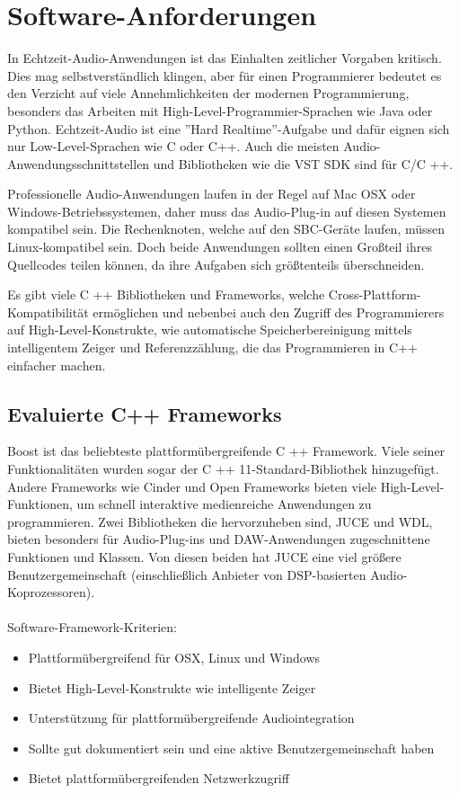 \section{Software-Anforderungen}

In Echtzeit-Audio-Anwendungen ist das Einhalten zeitlicher Vorgaben kritisch. Dies mag selbstverständlich klingen, aber für einen Programmierer bedeutet es den Verzicht auf viele Annehmlichkeiten der modernen Programmierung, besonders das Arbeiten mit High-Level-Programmier-Sprachen wie Java oder Python. Echtzeit-Audio ist eine ”Hard Realtime”-Aufgabe und dafür eignen sich nur Low-Level-Sprachen wie C oder C++. Auch die meisten Audio-Anwendungsschnittstellen und Bibliotheken wie die VST SDK sind für C/C ++.

Professionelle Audio-Anwendungen laufen in der Regel auf Mac OSX oder Windows-Betriebssystemen, daher muss das Audio-Plug-in auf diesen Systemen  kompatibel sein. Die Rechenknoten, welche auf den SBC-Geräte laufen, müssen  Linux-kompatibel sein. Doch beide Anwendungen sollten einen Großteil ihres Quellcodes teilen können, da ihre Aufgaben sich größtenteils überschneiden.

Es gibt viele C ++ Bibliotheken und Frameworks, welche Cross-Plattform-Kompatibilität ermöglichen und nebenbei auch den Zugriff des Programmierers auf High-Level-Konstrukte, wie automatische Speicherbereinigung mittels intelligentem Zeiger und Referenzzählung, die das Programmieren in C++ einfacher machen.

\subsection{Evaluierte C++ Frameworks}

Boost ist das beliebteste plattformübergreifende C ++ Framework. Viele seiner Funktionalitäten wurden sogar der C ++ 11-Standard-Bibliothek hinzugefügt. Andere Frameworks wie Cinder und Open Frameworks bieten viele High-Level-Funktionen, um schnell interaktive medienreiche Anwendungen zu programmieren. Zwei Bibliotheken die hervorzuheben sind, JUCE und WDL, bieten besonders für Audio-Plug-ins und DAW-Anwendungen zugeschnittene Funktionen und Klassen. Von diesen beiden hat JUCE eine viel größere Benutzergemeinschaft (einschließlich Anbieter von DSP-basierten Audio-Koprozessoren).\\
\\
\noindent
Software-Framework-Kriterien:

\begin{itemize}

\item Plattformübergreifend für OSX, Linux und Windows
\item Bietet High-Level-Konstrukte wie intelligente Zeiger
\item Unterstützung für plattformübergreifende Audiointegration
\item Sollte gut dokumentiert sein und eine aktive Benutzergemeinschaft haben
\item Bietet plattformübergreifenden Netzwerkzugriff

\end{itemize}


